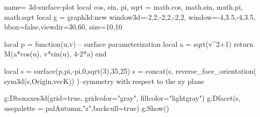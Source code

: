 \documentclass[border=5pt]{standalone}%
\begin{document}
\begin{luadraw}{name= 3d-surface-plot}
local cos, sin, pi, sqrt = math.cos, math.sin, math.pi, math.sqrt
local g = graph3d:new{ window3d={-2,2,-2,2,-2,2}, window={-4,3.5,-4,3.5}, bbox=false,viewdir={30,60}, size={10,10}}

local p = function(u,v)  -- surface parameterization
    local a = sqrt(v^2+1)
    return M(a*cos(u), v*sin(u), 4-2*a)
end

local s = surface(p,pi,-pi,0,sqrt(3),{35,25})
s = concat(s, reverse_face_orientation( sym3d(s,{Origin,vecK})) )--symmetry with respect to the xy plane

g:Dboxaxes3d({grid=true, gridcolor="gray", fillcolor="lightgray"})
g:Dfacet(s, {usepalette = {palAutumn,"z"},backcull=true})
g:Show() 
\end{luadraw}
\end{document}
